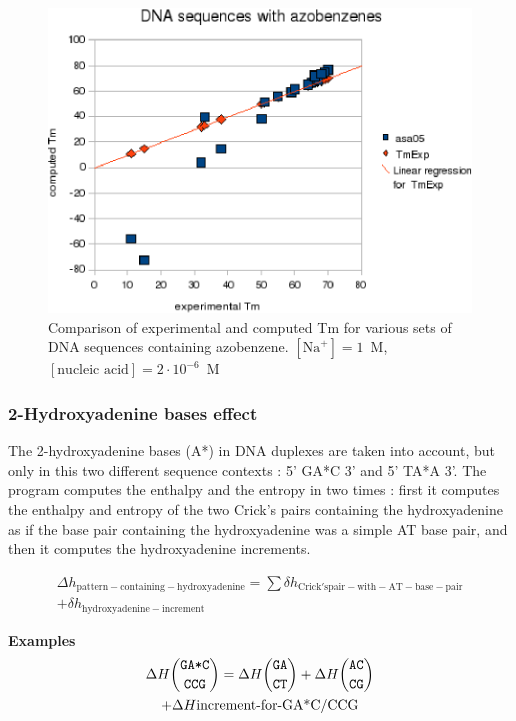 \documentclass{article}
\begin{document}
\begin{figure}[h]
\includegraphics{images/Azobenzene.eps}
\caption{Comparison of experimental and computed Tm for various sets of
 DNA sequences containing azobenzene. $[\mbox{Na}^+] = 1$~M, $[\mbox{nucleic acid}] = 2\cdot{}10^{-6}$~M}
\end{figure}

\subsubsection{2-Hydroxyadenine bases effect}

The 2-hydroxyadenine bases (A*) in DNA duplexes are taken into account, but only in this two different
sequence contexts : 5' GA*C 3' and 5' TA*A 3'. The program computes the enthalpy and the entropy in two
times : first it computes the enthalpy and entropy of the two Crick's pairs containing the hydroxyadenine
as if the base pair containing the hydroxyadenine was a simple AT base pair, and then it computes the hydroxyadenine
increments.

\begin{multline*}
\Delta{}h_\mathrm{pattern-containing-hydroxyadenine} =
\sum \delta{}h_\mathrm{Crick's pair-with-AT-base-pair} \\ +
\delta{}h_\mathrm{hydroxyadenine-increment}
\end{multline*}

\textbf{Examples}
\begin{multline*}
\Delta H {\mbox{\texttt{GA*C}} \choose \mbox{\texttt{CCG}}} = 
\Delta H {\mbox{\texttt{GA}} \choose \mbox{\texttt{CT}}} +
\Delta H {\mbox{\texttt{AC}} \choose \mbox{\texttt{CG}}} \\ +
\Delta H {\mbox{increment-for-GA*C/CCG}}\\
\end{multline*}
\end{document}
